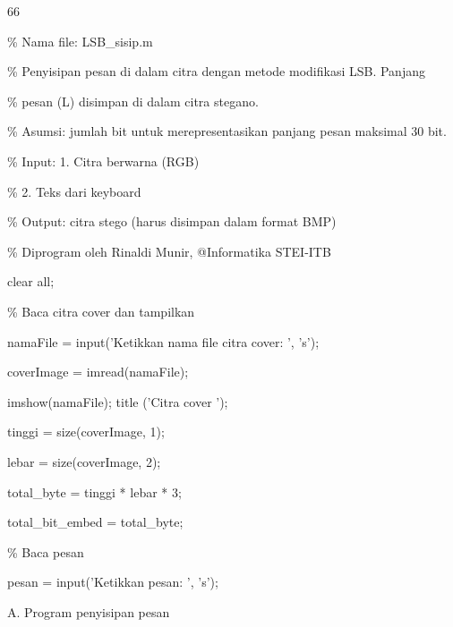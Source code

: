 \documentclass{article}
\begin{document}

66

\% Nama file: LSB\_sisip.m

\% Penyisipan pesan di dalam citra dengan metode modifikasi LSB. Panjang

\% pesan (L) disimpan di dalam citra stegano. 

\% Asumsi: jumlah bit untuk merepresentasikan panjang pesan maksimal 30 bit.

\% Input: 1. Citra berwarna (RGB)

\%        2. Teks dari keyboard

\% Output: citra stego (harus disimpan dalam format BMP)

\% Diprogram oleh Rinaldi Munir, @Informatika STEI-ITB


clear all;

\% Baca citra cover dan tampilkan

namaFile = input('Ketikkan nama file citra cover: ', 's');

coverImage = imread(namaFile);

imshow(namaFile); title ('Citra cover ');


tinggi = size(coverImage, 1);

lebar = size(coverImage, 2);

total\_byte = tinggi * lebar * 3;

total\_bit\_embed = total\_byte;


\% Baca pesan

pesan = input('Ketikkan pesan: ', 's');


A. Program penyisipan pesan
\end{document}
